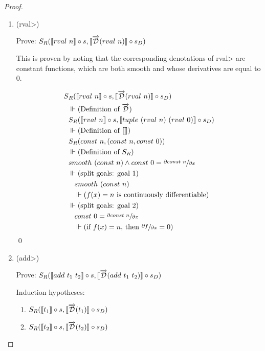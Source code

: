 \documentclass[11pt, final]{article}
\begin{document}
\begin{proof}
\begin{enumerate}
      \item (\<rval>)

      Prove: $S_{R}(\llbracket rval\ n \rrbracket \circ s, \llbracket \overrightarrow{\mathcal{D}}(rval\ n) \rrbracket \circ s_D)$

      This is proven by noting that the corresponding denotations of \<rval> are constant functions, which are both smooth and whose derivatives are equal to $0$.

      \begin{align*}
        S&_R(\llbracket rval\ n \rrbracket \circ s, \llbracket \overrightarrow{\mathcal{D}}(rval\ n) \rrbracket \circ s_D) \\
        &\Vdash \text{(Definition of $\overrightarrow{\mathcal{D}}$)}\\
        &S_R(\llbracket rval\ n \rrbracket \circ s, \llbracket tuple\ (rval\ n)\ (rval\ 0) \rrbracket \circ s_D) \\
        &\Vdash \text{(Definition of $\llbracket\rrbracket$)}\\
        &S_R(const\ n, (const\ n, const\ 0)) \\
        &\Vdash \text{(Definition of $S_R$)}\\
        &smooth\ (const\ n) \wedge
          const\ 0 = \sfrac{\partial{const\ n}}{\partial{x}} \\
        &\Vdash \text{(split goals: goal 1)}\\
        &\;\;\;smooth\ (const\ n) \\
        &\;\;\;\Vdash \text{($f(x) = n$ is continuously differentiable)}\\
        &\Vdash \text{(split goals: goal 2)}\\
        &\;\;\;const\ 0 = \sfrac{\partial{const\ n}}{\partial{x}} \\
        &\;\;\;\Vdash \text{(if $f(x) = n$, then $\sfrac{\partial{f}}{\partial{x}} = 0$)}
      \end{align*} \qed
      \item (\<add>)

      Prove: $S_R(\llbracket add\ t_1\ t_2 \rrbracket \circ s, \llbracket \overrightarrow{\mathcal{D}}(add\ t_1\ t_2) \rrbracket \circ s_D)$

      Induction hypotheses:
      \begin{enumerate}
        \item \label{eqn:subst_ih_add1}$S_R(\llbracket t_1 \rrbracket \circ s, \llbracket \overrightarrow{\mathcal{D}}(t_1) \rrbracket \circ s_D)$
        \item \label{eqn:subst_ih_add2}$S_R(\llbracket t_2 \rrbracket \circ s, \llbracket \overrightarrow{\mathcal{D}}(t_2) \rrbracket \circ s_D)$
      \end{enumerate}


\end{enumerate}
\end{proof}
\end{document}
